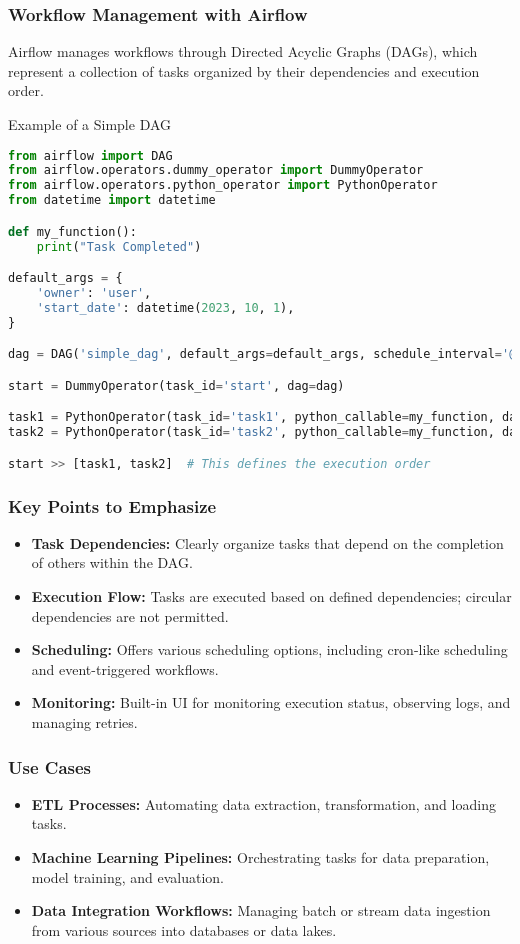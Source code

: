 \documentclass[aspectratio=169]{beamer}
\begin{document}
\begin{frame}[fragile]
    \frametitle{Workflow Management with Airflow}
    Airflow manages workflows through Directed Acyclic Graphs (DAGs), which represent a collection of tasks organized by their dependencies and execution order.
    
    \begin{block}{Example of a Simple DAG}
    \begin{lstlisting}[language=Python]
from airflow import DAG
from airflow.operators.dummy_operator import DummyOperator
from airflow.operators.python_operator import PythonOperator
from datetime import datetime

def my_function():
    print("Task Completed")

default_args = {
    'owner': 'user',
    'start_date': datetime(2023, 10, 1),
}

dag = DAG('simple_dag', default_args=default_args, schedule_interval='@daily')

start = DummyOperator(task_id='start', dag=dag)

task1 = PythonOperator(task_id='task1', python_callable=my_function, dag=dag)
task2 = PythonOperator(task_id='task2', python_callable=my_function, dag=dag)

start >> [task1, task2]  # This defines the execution order
    \end{lstlisting}
    \end{block}
\end{frame}

\begin{frame}[fragile]
    \frametitle{Key Points to Emphasize}
    \begin{itemize}
        \item \textbf{Task Dependencies:} Clearly organize tasks that depend on the completion of others within the DAG.
        \item \textbf{Execution Flow:} Tasks are executed based on defined dependencies; circular dependencies are not permitted.
        \item \textbf{Scheduling:} Offers various scheduling options, including cron-like scheduling and event-triggered workflows.
        \item \textbf{Monitoring:} Built-in UI for monitoring execution status, observing logs, and managing retries.
    \end{itemize}
\end{frame}

\begin{frame}[fragile]
    \frametitle{Use Cases}
    \begin{itemize}
        \item \textbf{ETL Processes:} Automating data extraction, transformation, and loading tasks.
        \item \textbf{Machine Learning Pipelines:} Orchestrating tasks for data preparation, model training, and evaluation.
        \item \textbf{Data Integration Workflows:} Managing batch or stream data ingestion from various sources into databases or data lakes.
    \end{itemize}
\end{frame}
\end{document}
